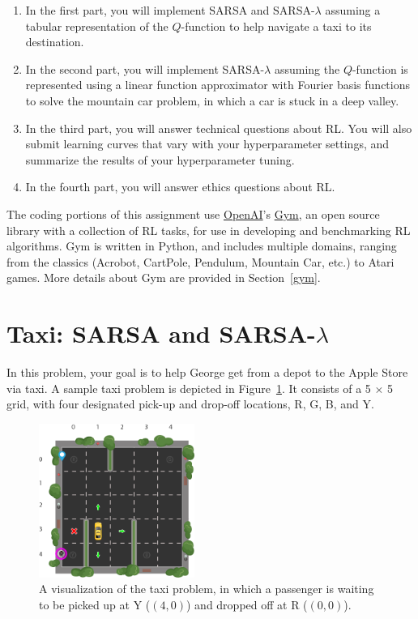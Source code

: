 \documentclass{article}
\begin{document}
\begin{enumerate}
    \item In the first part, you will implement SARSA and
      SARSA-$\lambda$ assuming a tabular representation of the
      $Q$-function to help navigate a taxi to its destination.
      
    \item In the second part, you will implement SARSA-$\lambda$
      assuming the $Q$-function is represented using a linear function
      approximator with Fourier basis functions to solve the mountain
      car problem, in which a car is stuck in a deep valley.
      
    \item In the third part, you will answer technical questions about
      RL.  You will also submit learning curves that vary with your
      hyperparameter settings, and summarize the results of your
      hyperparameter tuning.

    \item In the fourth part, you will answer ethics questions about RL.
\end{enumerate}

The coding portions of this assignment use
\href{https://openai.com/}{OpenAI}'s
\href{https://gym.openai.com/}{Gym}, an open source library with a
collection of RL tasks, for use in developing and benchmarking RL
algorithms.  Gym is written in Python, and includes multiple domains,
ranging from the classics (Acrobot, CartPole, Pendulum, Mountain Car,
etc.) to Atari games.  More details about Gym are provided in
Section~\ref{gym}.


\section{Taxi: SARSA and SARSA-$\lambda$}
In this problem, your goal is to help George get from a depot to the
Apple Store via taxi.  A sample taxi problem is depicted in
Figure~\ref{fig:taxi}.  It consists of a 5 $\times$ 5 grid, with four
designated pick-up and drop-off locations, R, G, B, and Y.

\begin{figure}[ht!]
  \centering
    \includegraphics[width=2in]{taxi.png}
    \caption{A visualization of the taxi problem, in which a passenger is
      waiting to be picked up at Y ($(4,0)$) and dropped off at R ($(0,0)$).}
    \label{fig:taxi}
\end{figure}
\end{document}
